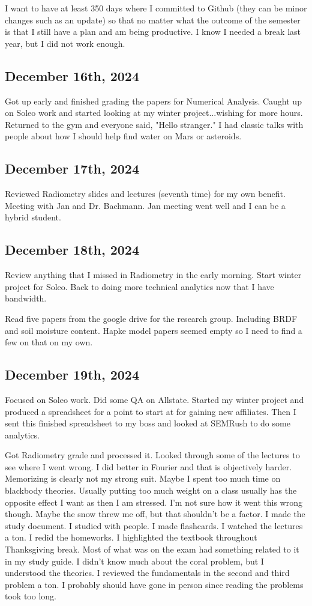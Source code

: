 \documentclass{article}
\begin{document}
I want to have at least 350 days where I committed to Github (they can be minor changes such as an update) so that no matter what the outcome of the semester is that I still have a plan and am being productive. I know I needed a break last year, but I did not work enough. 

\subsection{December 16th, 2024}
Got up early and finished grading the papers for Numerical Analysis. Caught up on Soleo work and started looking at my winter project...wishing for more hours. Returned to the gym and everyone said, "Hello stranger." 
I had classic talks with people about how I should help find water on Mars or asteroids. 

\subsection{December 17th, 2024}
Reviewed Radiometry slides and lectures (seventh time) for my own benefit. 
Meeting with Jan and Dr. Bachmann. 
Jan meeting went well and I can be a hybrid student. 

\subsection{December 18th, 2024}
Review anything that I missed in Radiometry in the early morning. Start winter project for Soleo. Back to doing more technical analytics now that I have bandwidth. 

Read five papers from the google drive for the research group. Including BRDF and soil moisture content. Hapke model papers seemed empty so I need to find a few on that on my own. 

\subsection{December 19th, 2024}
Focused on Soleo work. Did some QA on Allstate. Started my winter project and produced a spreadsheet for a point to start at for gaining new affiliates. Then I sent this finished spreadsheet to my boss and looked at SEMRush to do some analytics. 

Got Radiometry grade and processed it. Looked through some of the lectures to see where I went wrong. I did better in Fourier and that is objectively harder. Memorizing is clearly not my strong suit. Maybe I spent too much time on blackbody theories. Usually putting too much weight on a class usually has the opposite effect I want as then I am stressed. I'm not sure how it went this wrong though. Maybe the snow threw me off, but that shouldn't be a factor. I made the study document. I studied with people. I made flashcards. I watched the lectures a ton. I redid the homeworks. I highlighted the textbook throughout Thanksgiving break. Most of what was on the exam had something related to it in my study guide. I didn't know much about the coral problem, but I understood the theories. I reviewed the fundamentals in the second and third problem a ton. I probably should have gone in person since reading the problems took too long. 
\end{document}
